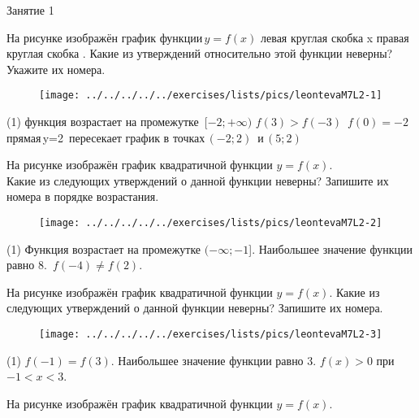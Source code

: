 %
%

\begin{class}[number=1]
	\begin{listofex}
		\item Занятие 1
	\end{listofex}
\end{class}

\begin{class}[number=2]
	\begin{listofex}
		\item На рисунке изображён график функции \( y=f(x) \) левая круглая скобка x правая круглая скобка . Какие из утверждений относительно этой функции неверны? Укажите их номера.
		\begin{figure}[h!]
			\centering
			\texttt{[image: ../../../../../exercises/lists/pics/leontevaM7L2-1]}
		\end{figure}
		\begin{tasks}(1)
			\task функция возрастает на промежутке  \( [-2; +\infty) \)
			\task \( f(3)> f(-3)  \)
			\task \( f(0) = -2 \)
			\task прямая y=2  пересекает график в точках \(  (-2; 2) \)  и \( (5; 2) \) 
		\end{tasks}
		\item На рисунке изображён график квадратичной функции \( y  =  f(x) \).
		\\
		Какие из следующих утверждений о данной функции неверны? Запишите их номера в порядке возрастания.
		\begin{figure}[h!]
			\centering
			\texttt{[image: ../../../../../exercises/lists/pics/leontevaM7L2-2]}
		\end{figure}
		\begin{tasks}(1)
			\task Функция возрастает на промежутке \( (-\infty;  -1 \)].
			\task Наибольшее значение функции равно \( 8 \).
			\task \( f(-4) \neq f(2) \).
		\end{tasks}
		\newpage
		\item На рисунке изображён график квадратичной функции \( y =  f(x) \).
		Какие из следующих утверждений о данной функции неверны? Запишите их номера.
		\begin{figure}[h!]
			\centering
			\texttt{[image: ../../../../../exercises/lists/pics/leontevaM7L2-3]}
		\end{figure}
		\begin{tasks}(1)
			\task \( f(-1)=f(3) \).
			\task Наибольшее значение функции равно \( 3 \).
			\task \( f(x)>0  \) при  \( -1<x<3 \).
		\end{tasks}
		\item На рисунке изображён график квадратичной функции \( y = f(x) \).
		

\end{listofex}
\end{class}
